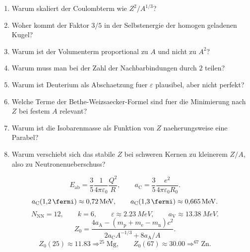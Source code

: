 \documentclass[11pt,a4paper]{scrartcl}
\newcommand{\MeV}{\si{MeV}}
\newcommand{\isotope}[2]{^{#1}\mathrm{#2}}
\theoremstyle{definition}
\theoremstyle{plain}
\theoremstyle{remark}
\newcommand{\Eab}{E_{\mathrm{ab}}}
\newcommand{\aV}{a_{\mathrm V}}
\newcommand{\aC}{a_{\mathrm C}}
\newcommand{\aA}{a_{\mathrm A}}
\begin{document}
\begin{enumerate}
    \item Warum skaliert der Coulombterm wie $Z^2/A^{1/3}$?
    \item Woher kommt der Faktor $3/5$ in der Selbstenergie der homogen geladenen Kugel?
    \item Warum ist der Volumenterm proportional zu $A$ und nicht zu $A^2$?
    \item Warum muss man bei der Zahl der Nachbarbindungen durch $2$ teilen?
    \item Warum ist Deuterium als Abschaetzung fuer $\varepsilon$ plausibel, aber nicht perfekt?
    \item Welche Terme der Bethe-Weizsaecker-Formel sind fuer die Minimierung nach $Z$ bei festem $A$ relevant?
    \item Warum ist die Isobarenmasse als Funktion von $Z$ naeherungsweise eine Parabel?
    \item Warum verschiebt sich das stabile $Z$ bei schweren Kernen zu kleinerem $Z/A$, also zu Neutronenueberschuss?
\end{enumerate}

\begin{summarybox}[title=Endergebnisse]
\[
    \Eab=\frac{3}{5}\frac{1}{4\pi\varepsilon_0}\frac{Q^2}{R},
    \qquad
    \aC=\frac{3}{5}\frac{e^2}{4\pi\varepsilon_0R_0}.
\]
\[
    \aC(\SI{1.2}{\fermi})\approx\SI{0.72}{\MeV},
    \qquad
    \aC(\SI{1.3}{\fermi})\approx\SI{0.665}{\MeV}.
\]
\[
    N_{\mathrm{NN}}=12,
    \qquad
    k=6,
    \qquad
    \varepsilon\approx\SI{2.23}{\MeV},
    \qquad
    \aV\approx\SI{13.38}{\MeV}.
\]
\[
    Z_0=\frac{4\aA-(m_{\mathrm p}+m_{\mathrm e}-m_{\mathrm n})c^2}
    {2\aC A^{-1/3}+8\aA/A}.
\]
\[
    Z_0(25)\approx11.83\Rightarrow \isotope{25}{Mg},
    \qquad
    Z_0(67)\approx30.00\Rightarrow \isotope{67}{Zn}.
\]
\end{summarybox}
\end{document}
